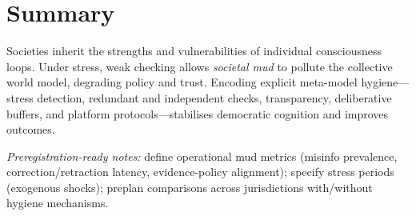 \documentclass[11pt,a4paper]{article}
\begin{document}
\section{Summary}
Societies inherit the strengths and vulnerabilities of individual consciousness loops. Under stress, weak checking allows \emph{societal mud} to pollute the collective world model, degrading policy and trust. Encoding explicit meta-model hygiene---stress detection, redundant and independent checks, transparency, deliberative buffers, and platform protocols---stabilises democratic cognition and improves outcomes.

\vfill
\noindent\textit{Preregistration-ready notes:} define operational mud metrics (misinfo prevalence, correction/retraction latency, evidence-policy alignment); specify stress periods (exogenous shocks); preplan comparisons across jurisdictions with/without hygiene mechanisms.
\end{document}
